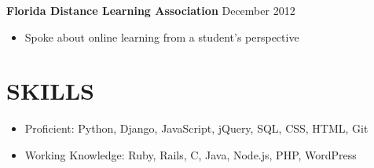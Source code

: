 \documentclass[margin]{res}
\begin{document}
\begin{resume}
\textbf{Florida Distance Learning Association} \hfill December 2012
\begin{itemize}[leftmargin=10pt]
\itemsep -2pt %
\item Spoke about online learning from a student's perspective
\end{itemize}

\section{SKILLS}
\begin{itemize}[leftmargin=0pt]
\item[] Proficient: Python, Django, JavaScript, jQuery, SQL, CSS, HTML, Git
\item[] Working Knowledge: Ruby, Rails, C, Java, Node.js, PHP, WordPress
\end{itemize}

\end{resume}
\end{document}
